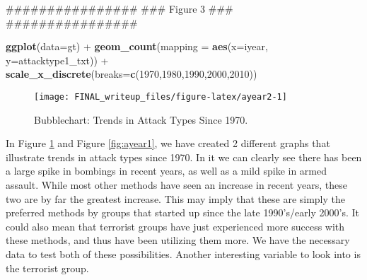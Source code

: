 \documentclass[11pt,letterpaper,]{article}
\newenvironment{Shaded}{\begin{snugshade}}{\end{snugshade}}
\newcommand{\KeywordTok}[1]{\textcolor[rgb]{0.13,0.29,0.53}{\textbf{{#1}}}}
\newcommand{\DataTypeTok}[1]{\textcolor[rgb]{0.13,0.29,0.53}{{#1}}}
\newcommand{\DecValTok}[1]{\textcolor[rgb]{0.00,0.00,0.81}{{#1}}}
\newcommand{\StringTok}[1]{\textcolor[rgb]{0.31,0.60,0.02}{{#1}}}
\newcommand{\NormalTok}[1]{{#1}}
\theoremstyle{definition}
\theoremstyle{definition}
\theoremstyle{definition}
\theoremstyle{remark}
\begin{document}
\begin{Shaded}
\begin{Highlighting}[]
\NormalTok{################}
\NormalTok{### Figure 3 ###}
\NormalTok{################}

\KeywordTok{ggplot}\NormalTok{(}\DataTypeTok{data=}\NormalTok{gt) +}
\StringTok{  }\KeywordTok{geom_count}\NormalTok{(}\DataTypeTok{mapping =} \KeywordTok{aes}\NormalTok{(}\DataTypeTok{x=}\NormalTok{iyear, }\DataTypeTok{y=}\NormalTok{attacktype1_txt)) +}
\StringTok{  }\KeywordTok{scale_x_discrete}\NormalTok{(}\DataTypeTok{breaks=}\KeywordTok{c}\NormalTok{(}\DecValTok{1970}\NormalTok{,}\DecValTok{1980}\NormalTok{,}\DecValTok{1990}\NormalTok{,}\DecValTok{2000}\NormalTok{,}\DecValTok{2010}\NormalTok{))}
\end{Highlighting}
\end{Shaded}

\begin{figure}

{\centering \texttt{[image: FINAL\_writeup\_files/figure-latex/ayear2-1]} 

}

\caption{Bubblechart: Trends in Attack Types Since 1970.}\label{fig:ayear2}
\end{figure}

In Figure \ref{fig:ayear2} and Figure \ref{fig:ayear1}, we have created
2 different graphs that illustrate trends in attack types since 1970. In
it we can clearly see there has been a large spike in bombings in recent
years, as well as a mild spike in armed assault. While most other
methods have seen an increase in recent years, these two are by far the
greatest increase. This may imply that these are simply the preferred
methods by groups that started up since the late 1990's/early 2000's. It
could also mean that terrorist groups have just experienced more success
with these methods, and thus have been utilizing them more. We have the
necessary data to test both of these possibilities. Another interesting
variable to look into is the terrorist group.
\end{document}
